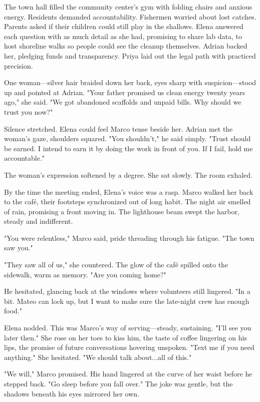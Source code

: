 The town hall filled the community center's gym with folding chairs and anxious energy. Residents demanded accountability. Fishermen worried about lost catches. Parents asked if their children could still play in the shallows. Elena answered each question with as much detail as she had, promising to share lab data, to host shoreline walks so people could see the cleanup themselves. Adrian backed her, pledging funds and transparency. Priya laid out the legal path with practiced precision.

One woman—silver hair braided down her back, eyes sharp with suspicion—stood up and pointed at Adrian. "Your father promised us clean energy twenty years ago," she said. "We got abandoned scaffolds and unpaid bills. Why should we trust you now?"

Silence stretched. Elena could feel Marco tense beside her. Adrian met the woman's gaze, shoulders squared. "You shouldn't," he said simply. "Trust should be earned. I intend to earn it by doing the work in front of you. If I fail, hold me accountable."

The woman's expression softened by a degree. She sat slowly. The room exhaled.

By the time the meeting ended, Elena's voice was a rasp. Marco walked her back to the café, their footsteps synchronized out of long habit. The night air smelled of rain, promising a front moving in. The lighthouse beam swept the harbor, steady and indifferent.

"You were relentless," Marco said, pride threading through his fatigue. "The town saw you."

"They saw all of us," she countered. The glow of the café spilled onto the sidewalk, warm as memory. "Are you coming home?"

He hesitated, glancing back at the windows where volunteers still lingered. "In a bit. Mateo can lock up, but I want to make sure the late-night crew has enough food."

Elena nodded. This was Marco's way of serving—steady, sustaining. "I'll see you later then." She rose on her toes to kiss him, the taste of coffee lingering on his lips, the promise of future conversations hovering unspoken. "Text me if you need anything." She hesitated. "We should talk about...all of this."

"We will," Marco promised. His hand lingered at the curve of her waist before he stepped back. "Go sleep before you fall over." The joke was gentle, but the shadows beneath his eyes mirrored her own.

